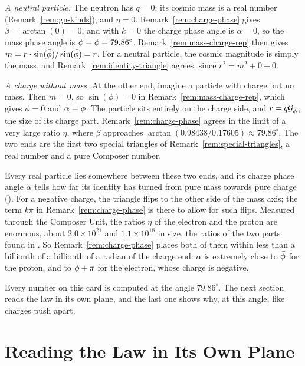 \begin{workedexample}
\emph{A neutral particle.} The neutron has $q = 0$: its cosmic mass is a real number (Remark~\ref{rem:gn-kinds}), and $\eta = 0$. Remark~\ref{rem:charge-phase} gives $\beta = \arctan(0) = 0$, and with $k = 0$ the charge phase angle is $\alpha = 0$, so the mass phase angle is $\phi = \bar{\phi} = 79.86^\circ$. Remark~\ref{rem:mass-charge-rep} then gives $m = r \cdot \sin(\bar{\phi})/\sin(\bar{\phi}) = r$. For a neutral particle, the cosmic magnitude is simply the mass, and Remark~\ref{rem:identity-triangle} agrees, since $r^2 = m^2 + 0 + 0$.

\emph{A charge without mass.} At the other end, imagine a particle with charge but no mass. Then $m = 0$, so $\sin(\phi) = 0$ in Remark~\ref{rem:mass-charge-rep}, which gives $\phi = 0$ and $\alpha = \bar{\phi}$. The particle sits entirely on the charge side, and $r = q\mathcal{G}_{\bar{\phi}}$, the size of its charge part. Remark~\ref{rem:charge-phase} agrees in the limit of a very large ratio $\eta$, where $\beta$ approaches $\arctan(0.98438/0.17605) \approx 79.86^\circ$. The two ends are the first two special triangles of Remark~\ref{rem:special-triangles}, a real number and a pure Composer number.

Every real particle lies somewhere between these two ends, and its charge phase angle $\alpha$ tells how far its identity has turned from pure mass towards pure charge (). For a negative charge, the triangle flips to the other side of the mass axis; the term $k\pi$ in Remark~\ref{rem:charge-phase} is there to allow for such flips. Measured through the Composer Unit, the ratios $\eta$ of the electron and the proton are enormous, about $2.0 \times 10^{21}$ and $1.1 \times 10^{18}$ in size, the ratios of the two parts found in . So Remark~\ref{rem:charge-phase} places both of them within less than a billionth of a billionth of a radian of the charge end: $\alpha$ is extremely close to $\bar{\phi}$ for the proton, and to $\bar{\phi} + \pi$ for the electron, whose charge is negative.
\end{workedexample}

Every number on this card is computed at the angle $79.86^\circ$. The next section reads the law in its own plane, and the last one shows why, at this angle, like charges push apart.

\section{Reading the Law in Its Own Plane}\label{sec:reading-law}\label{sec:which-angle}

